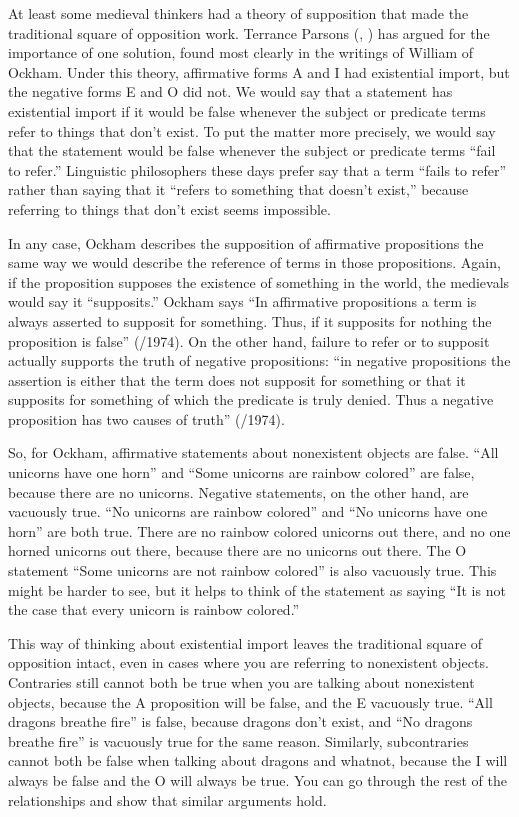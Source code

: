 At least some medieval thinkers had a theory of supposition that made the traditional square of opposition work. Terrance Parsons (\citeyear{Parsons1997}, \citeyear{Parsons2008})  has argued for the importance of one solution, found most clearly in the writings of William of Ockham. Under this theory, affirmative forms A and I had existential import, but the negative forms E and O did not. We would say that a statement has existential import if it would be false whenever the subject or predicate terms refer to things that don't exist. To put the matter more precisely, we would say that the statement would be false whenever the subject or predicate terms ``fail to refer.'' Linguistic philosophers these days prefer say that a term ``fails to refer'' rather than saying that it ``refers to something that doesn't exist,'' because referring to things that don't exist seems impossible.

In any case, Ockham describes the supposition of affirmative propositions the same way we would describe the reference of terms in those propositions. Again, if the proposition supposes the existence of something in the world, the medievals would say it ``supposits.''  Ockham says ``In affirmative propositions a term is always asserted to supposit for something. Thus, if it supposits for nothing the proposition is false'' (\citeyear{Ockham1343}/1974). On the other hand, failure to refer or to supposit actually supports the truth of negative propositions: ``in negative propositions the assertion is either that the term does not supposit for something or that it supposits for something of which the predicate is truly denied. Thus a negative proposition has two causes of truth'' (\citeyear{Ockham1343}/1974). 

So, for Ockham, affirmative statements about nonexistent objects are false. ``All unicorns have one horn'' and ``Some unicorns are rainbow colored'' are false, because there are no unicorns. Negative statements, on the other hand, are vacuously true. ``No unicorns are rainbow colored'' and ``No unicorns have one horn'' are both true. There are no rainbow colored unicorns out there, and no one horned unicorns out there, because there are no unicorns out there. The O statement ``Some unicorns are not rainbow colored'' is also vacuously true. This might be harder to see, but it helps to think of the statement as saying ``It is not the case that every unicorn is rainbow colored.'' 

This way of thinking about existential import leaves the traditional square of opposition intact, even in cases where you are referring to nonexistent objects. Contraries still cannot both be true when you are talking about nonexistent objects, because the A proposition will be false, and the E vacuously true. ``All dragons breathe fire'' is false, because dragons don't exist, and ``No dragons breathe fire'' is vacuously true for the same reason. Similarly, subcontraries cannot both be false when talking about dragons and whatnot, because the I will always be false and the O will always be true. You can go through the rest of the relationships and show that similar arguments hold. \label{proving_trad_square}
         
